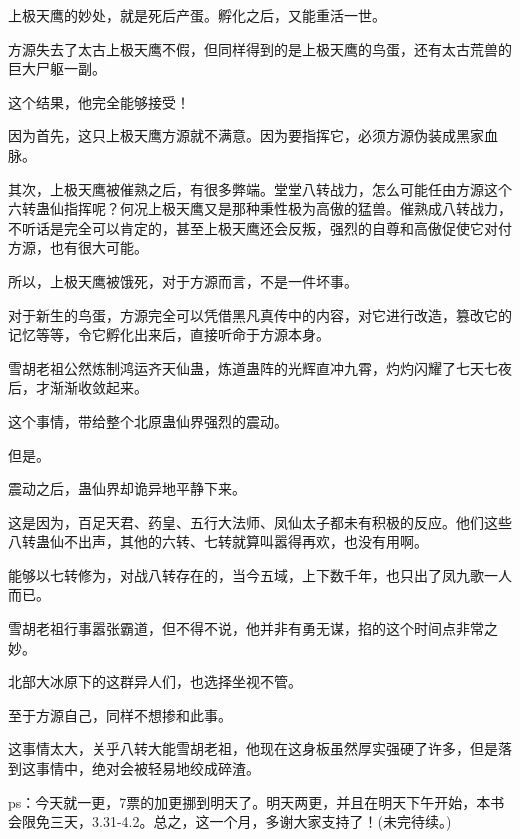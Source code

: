 \begin{this_body}
上极天鹰的妙处，就是死后产蛋。孵化之后，又能重活一世。

方源失去了太古上极天鹰不假，但同样得到的是上极天鹰的鸟蛋，还有太古荒兽的巨大尸躯一副。

这个结果，他完全能够接受！

因为首先，这只上极天鹰方源就不满意。因为要指挥它，必须方源伪装成黑家血脉。

其次，上极天鹰被催熟之后，有很多弊端。堂堂八转战力，怎么可能任由方源这个六转蛊仙指挥呢？何况上极天鹰又是那种秉性极为高傲的猛兽。催熟成八转战力，不听话是完全可以肯定的，甚至上极天鹰还会反叛，强烈的自尊和高傲促使它对付方源，也有很大可能。

所以，上极天鹰被饿死，对于方源而言，不是一件坏事。

对于新生的鸟蛋，方源完全可以凭借黑凡真传中的内容，对它进行改造，篡改它的记忆等等，令它孵化出来后，直接听命于方源本身。

雪胡老祖公然炼制鸿运齐天仙蛊，炼道蛊阵的光辉直冲九霄，灼灼闪耀了七天七夜后，才渐渐收敛起来。

这个事情，带给整个北原蛊仙界强烈的震动。

但是。

震动之后，蛊仙界却诡异地平静下来。

这是因为，百足天君、药皇、五行大法师、凤仙太子都未有积极的反应。他们这些八转蛊仙不出声，其他的六转、七转就算叫嚣得再欢，也没有用啊。

能够以七转修为，对战八转存在的，当今五域，上下数千年，也只出了凤九歌一人而已。

雪胡老祖行事嚣张霸道，但不得不说，他并非有勇无谋，掐的这个时间点非常之妙。

北部大冰原下的这群异人们，也选择坐视不管。

至于方源自己，同样不想掺和此事。

这事情太大，关乎八转大能雪胡老祖，他现在这身板虽然厚实强硬了许多，但是落到这事情中，绝对会被轻易地绞成碎渣。

ps：今天就一更，7票的加更挪到明天了。明天两更，并且在明天下午开始，本书会限免三天，3.31-4.2。总之，这一个月，多谢大家支持了！(未完待续。)

\end{this_body}

